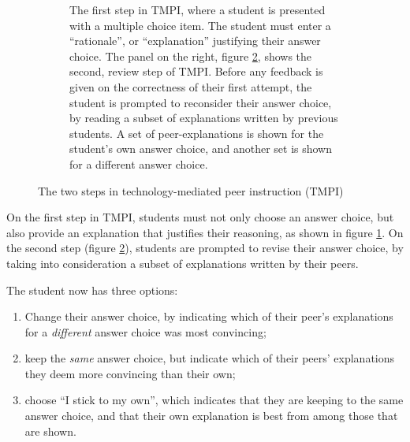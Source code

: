 \documentclass[notitlepage,12pt]{jedm}
\begin{document}
\begin{figure}
	\begin{subfigure}[b]{0.4\textwidth}
		\def\svgscale{0.50}
		
		\caption{
			The first step in TMPI, where a student is presented with a 
			multiple choice item. The student must enter a ``rationale'', or 
			``explanation'' justifying their answer choice.
			\newline
			\newline
			The panel on the right, figure \protect\ref{fig:question_review}, 
			shows the second, review step of TMPI.
			Before any feedback is given on the correctness of their first 
			attempt, the student is prompted to reconsider their answer choice, 
			by reading a subset of explanations written by previous students.
			A set of peer-explanations is shown for the student's own answer 
			choice, and another set is shown for a different answer choice. 
		}
		\label{fig:question_start}
	\end{subfigure}
	\qquad
	\begin{subfigure}[b]{0.6\textwidth}
		\def\svgscale{0.50}
		
		\caption{}
		\label{fig:question_review}
	\end{subfigure}
	\caption{The two steps in technology-mediated peer 
		instruction (TMPI)}
	\label{fig:tmpi}
\end{figure}

On the first step in TMPI, students must not only choose an answer choice, but 
also provide an explanation that justifies their reasoning, as shown in figure 
\ref{fig:question_start}.
On the second step (figure \ref{fig:question_review}), students are prompted to 
revise their answer choice, by taking into consideration a subset of 
explanations written by their peers.


The student now has three options:
\begin{enumerate}
	\item Change their answer choice, by indicating which of their peer's 
	explanations for a \textit{different} answer choice was most convincing;
	\item keep the \textit{same} answer choice, but indicate which of their 
	peers' explanations they deem more convincing than their own;
	\item choose ``I stick to my own'', which indicates that they are keeping 
	to the same answer choice, and that their own explanation is best from 
	among those that are shown.
\end{enumerate}
\end{document}
